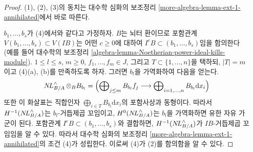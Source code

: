 \begin{proof}
(1), (2), (3)의 동치는 대수학 심화의 보조정리
\ref{more-algebra-lemma-ext-1-annihilated}에서 바로 따른다.

\medskip\noindent
$b_1, \ldots, b_s$가 (4)에서와 같다고 가정하자.
$B$는 뇌터 환이므로 포함관계 $V(b_1, \ldots, b_s) \subset V(IB)$는
어떤 $c \geq 0$에 대하여 $I^cB \subset (b_1, \ldots, b_s)$임을 함의한다
(예를 들어 대수학의 보조정리 \ref{algebra-lemma-Noetherian-power-ideal-kills-module}).
$1 \leq l \leq s$, $m \geq 0$, $f_1, \ldots, f_m \in J$, 그리고
$T \subset \{1, \ldots, n\}$을 택하되, $|T| = m$이고 (4)(a), (b)를 만족하도록 하자.
그러면 $b_l$을 가역화하여 다음을 얻는다.
$$
\mathop{N\!L}\nolimits_{B/A}^\wedge \otimes_B B_{b_l} =
\left(
\bigoplus\nolimits_{j \leq m} B_{b_l} f_j
\longrightarrow
\bigoplus\nolimits_{i = 1, \ldots, n} B_{b_l} \text{d}x_i
\right)
$$
또한 이 화살표는 직합인자 $\bigoplus_{i \in T} B_{b_l} \text{d}x_i$의 포함사상과 동형이다.
따라서 $H^{-1}(\mathop{N\!L}\nolimits_{B/A}^\wedge)$는 $b_l$-거듭제곱 꼬임이고,
$H^0(\mathop{N\!L}\nolimits_{B/A}^\wedge)$는 $b_l$을 가역화하면 유한 자유 가군이 된다.
포함관계 $I^cB \subset (b_1, \ldots, b_s)$와 결합하면,
$H^{-1}(\mathop{N\!L}\nolimits_{B/A}^\wedge)$가 $IB$-거듭제곱 꼬임임을 알 수 있다.
따라서 대수학 심화의 보조정리 \ref{more-algebra-lemma-ext-1-annihilated}의
조건 (4)가 성립한다. 이로써 (4)가 (2)를 함의함을 알 수 있다.


\end{proof}
